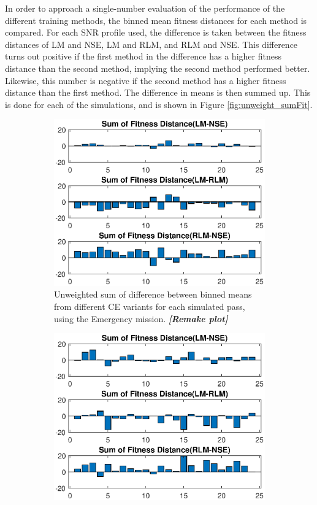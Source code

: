\par In order to approach a single-number evaluation of the performance of the different training methods, the binned mean fitness distances for each method is compared. For each SNR profile used, the difference is taken between the fitness distances of  LM and NSE, LM and RLM, and RLM and NSE. This difference turns out positive if the first method in the difference has a higher fitness distance than the second method, implying the second method performed better. Likewise, this number is negative if the second method has a higher fitness distance than the first method. The difference in means is then summed up. This is done for each of the simulations, and is shown in Figure \ref{fig:unweight_sumFit}.
\begin{figure}[ht]
\begin{subfigure}{0.55\linewidth}
	\centering
	\includegraphics[scale=0.6]{figures/c_sim_results/emer_unweighted_sumFitness.eps}
	\caption{Unweighted sum of difference between binned means from different CE variants for each simulated pass, using the Emergency mission. \textbf{\textit{[Remake plot]}}}
	\label{fig:cSimUnweightEmer}
\end{subfigure}%
\begin{subfigure}{0.55\linewidth}
	\centering
	\includegraphics[scale=0.6]{figures/c_sim_results/coop_unweighted_sumFitness.eps}

\end{subfigure}
\end{figure}
